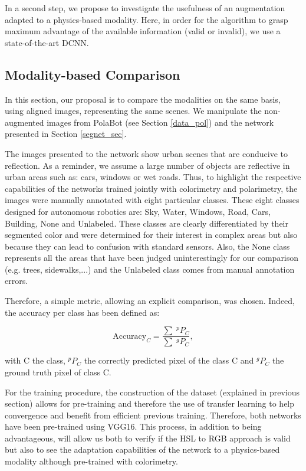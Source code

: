 In a second step, we propose to investigate the usefulness of an augmentation adapted to a physics-based modality. Here, in order for the algorithm to grasp maximum advantage of the available information (valid or invalid), we use a state-of-the-art DCNN. 

\subsection{Modality-based Comparison}

In this section, our proposal is to compare the modalities on the same basis, using aligned images, representing the same scenes.
We manipulate the non-augmented images from PolaBot (see Section \ref{data_pol}) and the network presented in Section \ref{segnet_sec}.

The images presented to the network show urban scenes that are conducive to reflection. As a reminder, we assume a large number of objects are reflective in urban areas such as: cars, windows or wet roads.
Thus, to highlight the respective capabilities of the networks trained jointly with colorimetry and polarimetry, the images were manually annotated with eight particular classes.
These eight classes designed for autonomous robotics are: \textcolor{sky}{Sky}, \textcolor{water}{Water}, \textcolor{windows}{Windows}, \textcolor{road}{Road}, \textcolor{car}{Cars}, \textcolor{buildings}{Building}, \textcolor{none}{None} and \textcolor{black}{Unlabeled}. These classes are clearly differentiated by their segmented color and were determined for their interest in complex areas but also because they can lead to confusion with standard sensors. Also, the None class represents all the areas that have been judged uninterestingly for our comparison (e.g. trees, sidewalks,...) and the Unlabeled class comes from manual annotation errors.


Therefore, a simple metric, allowing an explicit comparison, was chosen. Indeed, the accuracy per class has been defined as:


\begin{equation}
\textrm{Accuracy}_C = \frac{\sum \; ^pP_C}{\sum \; ^gP_C},
\end{equation}

with C the class, $^pP_C$ the correctly predicted pixel of the class C and $^gP_C$ the ground truth pixel of class C.

For the training procedure, the construction of the dataset (explained in previous section) allows for pre-training and therefore the use of transfer learning\cite{torrey2010transfer,pan2009survey} to help convergence and benefit from efficient previous training. Therefore, both networks have been pre-trained using VGG16. 
This process, in addition to being advantageous, will allow us both to verify if the HSL to RGB approach is valid but also to see the adaptation capabilities of the network to a physics-based modality although pre-trained with colorimetry.

